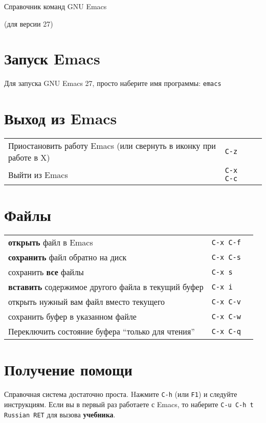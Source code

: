 \documentclass[10pt]{article}
\newlength{\ColWidth}
\newlength{\ColThreeWidth}
\newcommand{\versionemacs}[0]{27} %
\newcommand{\kbd}[1]{\texttt{#1}}
\begin{document}

\centerline{Справочник команд GNU Emacs}
\centerline{(для версии \versionemacs)}

\section{Запуск Emacs}

Для запуска GNU Emacs \versionemacs, просто наберите имя программы: \kbd{emacs}

\section{Выход из Emacs}

\begin{tabular}{p{\ColWidth}p{\ColThreeWidth}p{\ColThreeWidth}}
Приостановить работу Emacs (или свернуть в иконку при работе в X) & \kbd{C-z} \\
Выйти из Emacs & \kbd{C-x C-c} \\
\end{tabular}

\section{Файлы}

\begin{tabular}{p{\ColWidth}p{\ColThreeWidth}p{\ColThreeWidth}}
{\bf открыть} файл в Emacs & \kbd{C-x C-f} \\
{\bf сохранить} файл обратно на диск & \kbd{C-x C-s} \\
сохранить {\bf все} файлы & \kbd{C-x s} \\
{\bf вставить} содержимое другого файла в текущий буфер & \kbd{C-x i} \\
открыть нужный вам файл вместо текущего & \kbd{C-x C-v} \\
сохранить буфер в указанном файле & \kbd{C-x C-w} \\
Переключить состояние буфера ``только для чтения'' & \kbd{C-x C-q} \\
\end{tabular}

\section{Получение помощи}

Справочная система достаточно проста. Hажмите \kbd{C-h} (или \kbd{F1}) и
следуйте инструкциям.  Если вы в первый раз работаете с Emacs, то наберите
\kbd{C-u C-h t Russian RET} для вызова {\bf учебника}.
\end{document}
